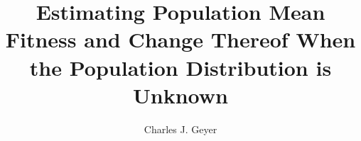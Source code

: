 \documentclass[11pt]{article}
\begin{document}
\title{Estimating Population Mean Fitness and Change Thereof When
    the Population Distribution is Unknown}

\author{Charles J. Geyer}

\maketitle
\end{document}
